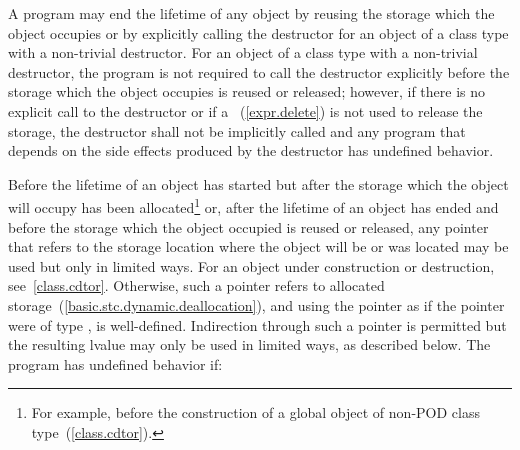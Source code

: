 \pnum
A program may end the lifetime of any object by reusing the storage
which the object occupies or by explicitly calling the destructor for an
object of a class type with a non-trivial destructor. For an object of a
class type with a non-trivial destructor, the program is not required to
call the destructor explicitly before the storage which the object
occupies is reused or released; however, if there is no explicit call to
the destructor or if a ~(\ref{expr.delete})
is not used to release the storage, the destructor shall not be
implicitly called and any program that depends on the side effects
produced by the destructor has undefined behavior.

\pnum
Before the lifetime of an object has started but after the storage which
the object will occupy has been allocated\footnote{For example, before the
construction of a global object of
non-POD class type~(\ref{class.cdtor}).}
or, after the lifetime of an object has ended and before the storage
which the object occupied is reused or released, any pointer that refers
to the storage location where the object will be or was located may be
used but only in limited ways.
For an object under construction or destruction, see~\ref{class.cdtor}.
Otherwise, such
a pointer refers to allocated
storage~(\ref{basic.stc.dynamic.deallocation}), and using the pointer as
if the pointer were of type , is
well-defined. Indirection through such a pointer is permitted but the resulting lvalue may only be used in
limited ways, as described below. The
program has undefined behavior if:

